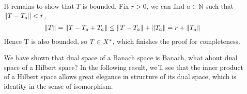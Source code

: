 \begin{proposition}
\begin{pf}{}{}
	It remains to show that $T$ is bounded. Fix $r>0$, we can find $a\in\mathbb{N}$ such that $\left\|{T-T_a}\right\|<r$,
	\begin{equation}
		\begin{split}
			\left\|{T}\right\|&=\left\|{T-T_a+T_a}\right\|
			\leq\left\|{T-T_a}\right\|+\left\|{T_a}\right\|
			=r+\left\|{T_a}\right\|
		\end{split}
	\end{equation}
	Hence T is also bounded, so $T\in {X}^*$, which finishes the proof for completeness.
\end{pf}
\end{proposition}



We have shown that dual space of a Banach space is Banach, what about dual space of a Hilbert space? In the following result, we'll see that the inner product of a Hilbert space allows great elegance in structure of its dual space, which is identity in the sense of isomorphism.

